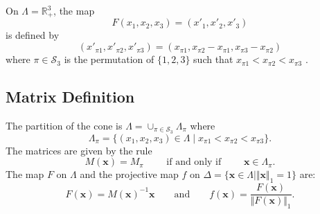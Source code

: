 On $\Lambda=\mathbb{R}^3_+$, the map
\[
F (x_1,x_2,x_3) = (x'_1,x'_2,x'_3)
\]
is defined by
\[
    (x'_{\pi 1}, x'_{\pi 2}, x'_{\pi 3}) =
    (x_{\pi 1}, x_{\pi 2}-x_{\pi 1}, x_{\pi 3}-x_{\pi 2})
\]
where $\pi\in\mathcal{S}_3$ is the permutation of $\{1,2,3\}$ such that
$x_{\pi 1}<x_{\pi 2}<x_{\pi 3}$ \cite{MR1336331}.
\subsection{Matrix Definition}
The partition of the cone is
$\Lambda=\cup_{\pi\in\mathcal{S}_3}\Lambda_\pi$ where
\[
    \Lambda_\pi = \{(x_1,x_2,x_3)\in\Lambda\mid 
	x_{\pi 1}< x_{\pi 2}< x_{\pi 3}\}.
\]
The matrices are given by the rule
\[
    M(\mathbf{x}) = M_\pi
    \qquad\text{ if and only if }\qquad
    \mathbf{x}\in\Lambda_\pi.
\]
The map $F$ on $\Lambda$ and
the projective map $f$ on
$\Delta=\{\mathbf{x}\in\Lambda\mid\Vert\mathbf{x}\Vert_1=1\}$ are:
\[
    F(\mathbf{x}) = M(\mathbf{x})^{-1}\mathbf{x}
    \qquad\text{and}\qquad
    f(\mathbf{x}) = \frac{F(\mathbf{x})}{\Vert F(\mathbf{x})\Vert_1}.
\]
